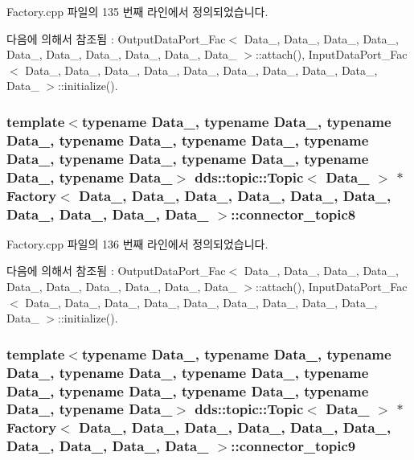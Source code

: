 Factory.\+cpp 파일의 135 번째 라인에서 정의되었습니다.



다음에 의해서 참조됨 \+:  Output\+Data\+Port\+\_\+\+Fac$<$ Data\+\_, Data\+\_, Data\+\_, Data\+\_, Data\+\_, Data\+\_, Data\+\_, Data\+\_, Data\+\_, Data\+\_ $>$\+::attach(), Input\+Data\+Port\+\_\+\+Fac$<$ Data\+\_, Data\+\_, Data\+\_, Data\+\_, Data\+\_, Data\+\_, Data\+\_, Data\+\_, Data\+\_, Data\+\_ $>$\+::initialize().

\subsubsection[{\texorpdfstring{connector\+\_\+topic8}{connector_topic8}}]{\setlength{\rightskip}{0pt plus 5cm}template$<$typename Data\+\_, typename Data\+\_, typename Data\+\_, typename Data\+\_, typename Data\+\_, typename Data\+\_, typename Data\+\_, typename Data\+\_, typename Data\+\_, typename Data\+\_$>$ dds\+::topic\+::\+Topic$<$ Data\+\_ $>$ $\ast$ {\bf Factory}$<$ Data\+\_, Data\+\_, Data\+\_, Data\+\_, Data\+\_, Data\+\_, Data\+\_, Data\+\_, Data\+\_, Data\+\_ $>$\+::connector\+\_\+topic8}\hypertarget{classFactory_a567cf4a6f03c8dd9be6cf26f6fd277d5}{}\label{classFactory_a567cf4a6f03c8dd9be6cf26f6fd277d5}


Factory.\+cpp 파일의 136 번째 라인에서 정의되었습니다.



다음에 의해서 참조됨 \+:  Output\+Data\+Port\+\_\+\+Fac$<$ Data\+\_, Data\+\_, Data\+\_, Data\+\_, Data\+\_, Data\+\_, Data\+\_, Data\+\_, Data\+\_, Data\+\_ $>$\+::attach(), Input\+Data\+Port\+\_\+\+Fac$<$ Data\+\_, Data\+\_, Data\+\_, Data\+\_, Data\+\_, Data\+\_, Data\+\_, Data\+\_, Data\+\_, Data\+\_ $>$\+::initialize().

\subsubsection[{\texorpdfstring{connector\+\_\+topic9}{connector_topic9}}]{\setlength{\rightskip}{0pt plus 5cm}template$<$typename Data\+\_, typename Data\+\_, typename Data\+\_, typename Data\+\_, typename Data\+\_, typename Data\+\_, typename Data\+\_, typename Data\+\_, typename Data\+\_, typename Data\+\_$>$ dds\+::topic\+::\+Topic$<$ Data\+\_ $>$ $\ast$ {\bf Factory}$<$ Data\+\_, Data\+\_, Data\+\_, Data\+\_, Data\+\_, Data\+\_, Data\+\_, Data\+\_, Data\+\_, Data\+\_ $>$\+::connector\+\_\+topic9}\hypertarget{classFactory_adffa083b38163d0e5b912250cb27cb58}{}\label{classFactory_adffa083b38163d0e5b912250cb27cb58}


